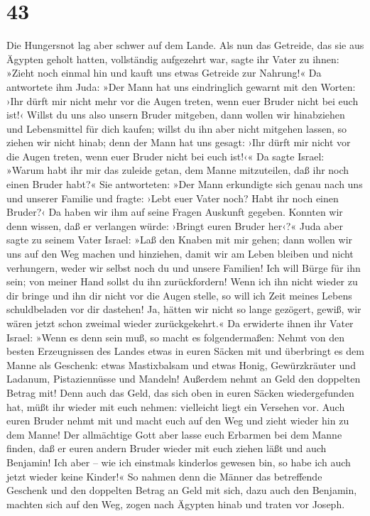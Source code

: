 \hypertarget{section-42}{%
\section{43}\label{section-42}}

 Die Hungersnot lag aber schwer auf dem Lande.
 Als nun das Getreide, das sie aus Ägypten geholt hatten,
vollständig aufgezehrt war, sagte ihr Vater zu ihnen: »Zieht noch einmal
hin und kauft uns etwas Getreide zur Nahrung!«  Da
antwortete ihm Juda: »Der Mann hat uns eindringlich gewarnt mit den
Worten: ›Ihr dürft mir nicht mehr vor die Augen treten, wenn euer Bruder
nicht bei euch ist!‹  Willst du uns also unsern Bruder
mitgeben, dann wollen wir hinabziehen und Lebensmittel für dich kaufen;
 willst du ihn aber nicht mitgehen lassen, so ziehen wir
nicht hinab; denn der Mann hat uns gesagt: ›Ihr dürft mir nicht vor die
Augen treten, wenn euer Bruder nicht bei euch ist!‹«  Da
sagte Israel: »Warum habt ihr mir das zuleide getan, dem Manne
mitzuteilen, daß ihr noch einen Bruder habt?«  Sie
antworteten: »Der Mann erkundigte sich genau nach uns und unserer
Familie und fragte: ›Lebt euer Vater noch? Habt ihr noch einen Bruder?‹
Da haben wir ihm auf seine Fragen Auskunft gegeben. Konnten wir denn
wissen, daß er verlangen würde: ›Bringt euren Bruder her‹?«
 Juda aber sagte zu seinem Vater Israel: »Laß den Knaben
mit mir gehen; dann wollen wir uns auf den Weg machen und hinziehen,
damit wir am Leben bleiben und nicht verhungern, weder wir selbst noch
du und unsere Familien!  Ich will Bürge für ihn sein; von
meiner Hand sollst du ihn zurückfordern! Wenn ich ihn nicht wieder zu
dir bringe und ihn dir nicht vor die Augen stelle, so will ich Zeit
meines Lebens schuldbeladen vor dir dastehen!  Ja, hätten
wir nicht so lange gezögert, gewiß, wir wären jetzt schon zweimal wieder
zurückgekehrt.«  Da erwiderte ihnen ihr Vater Israel:
»Wenn es denn sein muß, so macht es folgendermaßen: Nehmt von den besten
Erzeugnissen des Landes etwas in euren Säcken mit und überbringt es dem
Manne als Geschenk: etwas Mastixbalsam und etwas Honig, Gewürzkräuter
und Ladanum, Pistaziennüsse und Mandeln!  Außerdem nehmt
an Geld den doppelten Betrag mit! Denn auch das Geld, das sich oben in
euren Säcken wiedergefunden hat, müßt ihr wieder mit euch nehmen:
vielleicht liegt ein Versehen vor.  Auch euren Bruder
nehmt mit und macht euch auf den Weg und zieht wieder hin zu dem Manne!
 Der allmächtige Gott aber lasse euch Erbarmen bei dem
Manne finden, daß er euren andern Bruder wieder mit euch ziehen läßt und
auch Benjamin! Ich aber -- wie ich einstmals kinderlos gewesen bin, so
habe ich auch jetzt wieder keine Kinder!«  So nahmen denn
die Männer das betreffende Geschenk und den doppelten Betrag an Geld mit
sich, dazu auch den Benjamin, machten sich auf den Weg, zogen nach
Ägypten hinab und traten vor Joseph.


